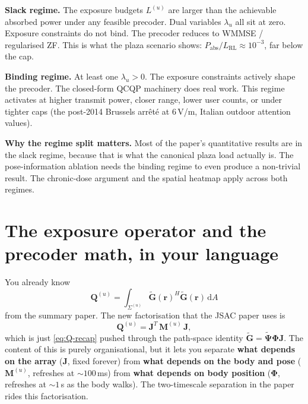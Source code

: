 \documentclass[11pt]{article}
\newenvironment{defs}[1][]{%
  \begin{mdframed}[backgroundcolor=blue!4,linecolor=blue!40!black,
    linewidth=0.4pt,roundcorner=2pt,innertopmargin=8pt,
    innerbottommargin=8pt,innerleftmargin=10pt,innerrightmargin=10pt,
    frametitle={\textbf{#1}},frametitlebackgroundcolor=blue!10]%
}{\end{mdframed}}
\newcommand{\rr}{\mathbf{r}}
\newcommand{\Pabs}{P_{\mathrm{abs}}}
\newcommand{\Qmat}{\mathbf{Q}}
\newcommand{\Mmat}{\mathbf{M}}
\newcommand{\Jmat}{\mathbf{J}}
\newcommand{\Phimat}{\mathbf{\Phi}}
\begin{document}
\begin{defs}[The "regime" jargon]
\textbf{Slack regime.} The exposure budgets $L^{(u)}$ are larger than
the achievable absorbed power under any feasible precoder. Dual
variables $\lambda_u$ all sit at zero. Exposure constraints do not
bind. The precoder reduces to WMMSE / regularised ZF. This is what
the plaza scenario shows: $\Pabs/L_{\mathrm{RL}} \approx 10^{-3}$, far
below the cap.

\textbf{Binding regime.} At least one $\lambda_u > 0$. The exposure
constraints actively shape the precoder. The closed-form QCQP machinery
does real work. This regime activates at higher transmit power,
closer range, lower user counts, or under tighter caps (the post-2014
Brussels arrêté at $6\,$V/m, Italian outdoor attention values).

\textbf{Why the regime split matters.} Most of the paper's quantitative
results are in the slack regime, because that is what the canonical
plaza load actually is. The pose-information ablation needs the
binding regime to even produce a non-trivial result. The chronic-dose
argument and the spatial heatmap apply across both regimes.
\end{defs}

\section{The exposure operator and the precoder math, in your language}

You already know
\begin{equation}\label{eq:Q-recap}
  \Qmat^{(u)} = \int_{\Sigma^{(u)}} \tilde{\mathbf{G}}(\rr)^H
  \tilde{\mathbf{G}}(\rr) \, \mathrm{d} A
\end{equation}
from the summary paper. The new factorisation that the JSAC paper
uses is
\begin{equation}\label{eq:Q-factor-recap}
  \Qmat^{(u)} = \Jmat^T\,\Mmat^{(u)}\,\Jmat,
\end{equation}
which is just \eqref{eq:Q-recap} pushed through the path-space
identity $\tilde{\mathbf{G}} = \tilde{\bm\Psi} \Phimat \Jmat$. The
content of this is purely organisational, but it lets you separate
\textbf{what depends on the array} ($\Jmat$, fixed forever) from
\textbf{what depends on the body and pose} ($\Mmat^{(u)}$, refreshes at
$\sim 100\,$ms) from \textbf{what depends on body position}
($\Phimat$, refreshes at $\sim 1\,$s as the body walks). The
two-timescale separation in the paper rides this factorisation.
\end{document}

